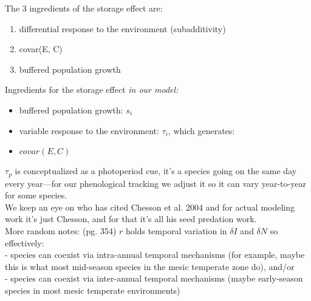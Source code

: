 \documentclass[11pt,a4paper,oneside]{article}
\begin{document}
\noindent The 3 ingredients of the storage effect are:
\begin{enumerate}
\item differential response to the environment (subadditivity)
\item covar(E, C)
\item buffered population growth
\end{enumerate}

\noindent Ingredients for the storage effect \emph{in our model:}
\begin{itemize}
\item buffered population growth: \(s_{i}\)
\item variable response to the environment: \(\tau_{i}\), which generates:
\item \(covar(E,C)\)
\end{itemize}

\(\tau_{p}\) is conceptualized as a photoperiod cue, it's a species going on the same day every year---for our phenological tracking we adjust it so it can vary year-to-year for some species.\\


\noindent We keep an eye on who has cited Chesson et al. 2004
and for actual modeling work it's just Chesson, and for that it's all
his seed predation work.\\

\noindent More random notes: \citet{Chesson:2000vd} (pg. 354) \(r\) holds temporal variation in \(\delta I\) and \(\delta N\) so effectively:\\
- species can coexist via intra-annual temporal mechanisms (for example, maybe this is what most mid-season species in the mesic temperate zone do), and/or\\
- species can coexist via inter-annual temporal mechanisms (maybe early-season species in most mesic temperate environments)\\
\end{document}
